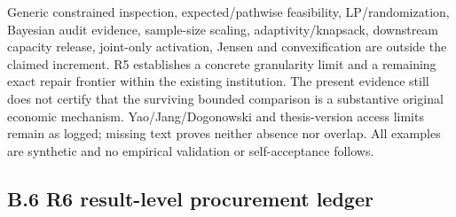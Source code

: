 \documentclass[
  11pt,
  a4paper,
]{article}
\begin{document}
Generic constrained inspection, expected/pathwise feasibility,
LP/randomization, Bayesian audit evidence, sample-size scaling,
adaptivity/knapsack, downstream capacity release, joint-only activation,
Jensen and convexification are outside the claimed increment. R5
establishes a concrete granularity limit and a remaining exact repair
frontier within the existing institution. The present evidence still
does not certify that the surviving bounded comparison is a substantive
original economic mechanism. Yao/Jang/Dogonowski and thesis-version
access limits remain as logged; missing text proves neither absence nor
overlap. All examples are synthetic and no empirical validation or
self-acceptance follows.

\hypertarget{b.6-r6-result-level-procurement-ledger}{%
\subsection{B.6 R6 result-level procurement
ledger}\label{b.6-r6-result-level-procurement-ledger}}
\end{document}
